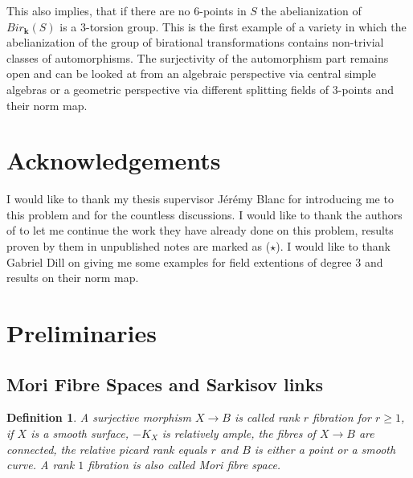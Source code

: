 \documentclass[12pt, oneside, reqno]{amsart}
\newtheorem{definition}[theorem]{Definition}
\begin{document}
\noindent This also implies, that if there are no $6$-points in $S$ the abelianization of $Bir_{\textbf{k}}(S)$ is a $3$-torsion group. This is the first example of a variety in which the abelianization of the group of birational transformations contains non-trivial classes of automorphisms. The surjectivity of the automorphism part remains open and can be looked at from an algebraic perspective via central simple algebras or a geometric perspective via different splitting fields of $3$-points and their norm map.
\section*{Acknowledgements}
\noindent I would like to thank my thesis supervisor Jérémy Blanc for introducing me to this problem and for the countless discussions. I would like to thank the authors of \cite{BSY} to let me continue the work they have already done on this problem, results proven by them in unpublished notes are marked as ($\star$). I would like to thank Gabriel Dill on giving me some examples for field extentions of degree $3$ and results on their norm map. 
\section{Preliminaries}
\noindent
\subsection{Mori Fibre Spaces and Sarkisov links}
\begin{definition} \label{RankRFibration}
    A surjective morphism $X \rightarrow B$ is called rank $r$ fibration for $r \geq 1$, if $X$ is a smooth surface, $-K_X$ is relatively ample, the fibres of $X \rightarrow B$ are connected, the relative picard rank equals $r$ and $B$ is either a point or a smooth curve. A rank $1$ fibration is also called Mori fibre space.
\end{definition}
\end{document}
